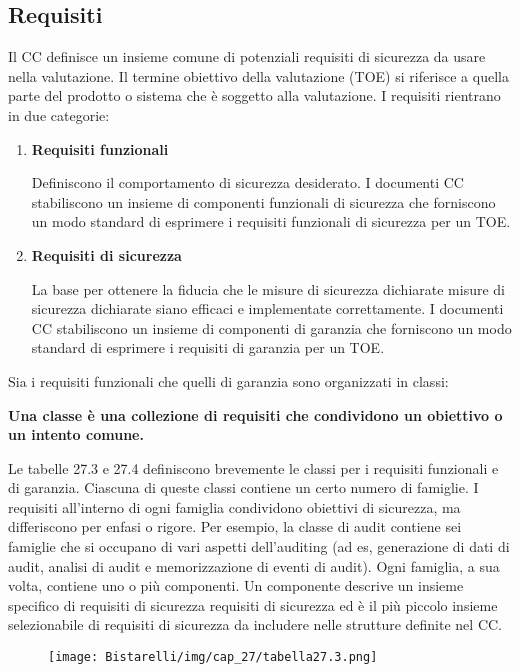 \subsection{Requisiti}
Il CC definisce un insieme comune di potenziali requisiti di sicurezza da usare nella valutazione. Il termine obiettivo della valutazione (TOE) si riferisce a quella parte del prodotto o sistema che è soggetto alla valutazione. I requisiti rientrano in due categorie:
\begin{enumerate}
    \item \textbf{Requisiti funzionali}
    
    Definiscono il comportamento di sicurezza desiderato. I documenti CC stabiliscono un insieme di componenti funzionali di sicurezza che forniscono un modo standard di esprimere i requisiti funzionali di sicurezza per un TOE.
    
    \item \textbf{Requisiti di sicurezza}
    
    La base per ottenere la fiducia che le misure di sicurezza dichiarate misure di sicurezza dichiarate siano efficaci e implementate correttamente. I documenti CC stabiliscono un insieme di componenti di garanzia che forniscono un modo standard di esprimere i requisiti di garanzia per un TOE.
\end{enumerate}
Sia i requisiti funzionali che quelli di garanzia sono organizzati in classi:
\begin{center}
    \textbf{Una classe è una collezione di requisiti che condividono un obiettivo o un intento comune.}
\end{center}
Le tabelle 27.3 e 27.4 definiscono brevemente le classi per i requisiti funzionali e di garanzia. Ciascuna di queste classi contiene un certo numero di famiglie. I requisiti all'interno di ogni famiglia condividono obiettivi di sicurezza, ma differiscono per enfasi o rigore. Per esempio, la classe di audit contiene sei famiglie che si occupano di vari aspetti dell'auditing (ad es, generazione di dati di audit, analisi di audit e memorizzazione di eventi di audit). Ogni famiglia, a sua volta, contiene uno o più componenti. Un componente descrive un insieme specifico di requisiti di sicurezza requisiti di sicurezza ed è il più piccolo insieme selezionabile di requisiti di sicurezza da includere nelle strutture definite nel CC.

\begin{figure}[H]
	\centering
    \texttt{[image: Bistarelli/img/cap\_27/tabella27.3.png]}
\end{figure}

